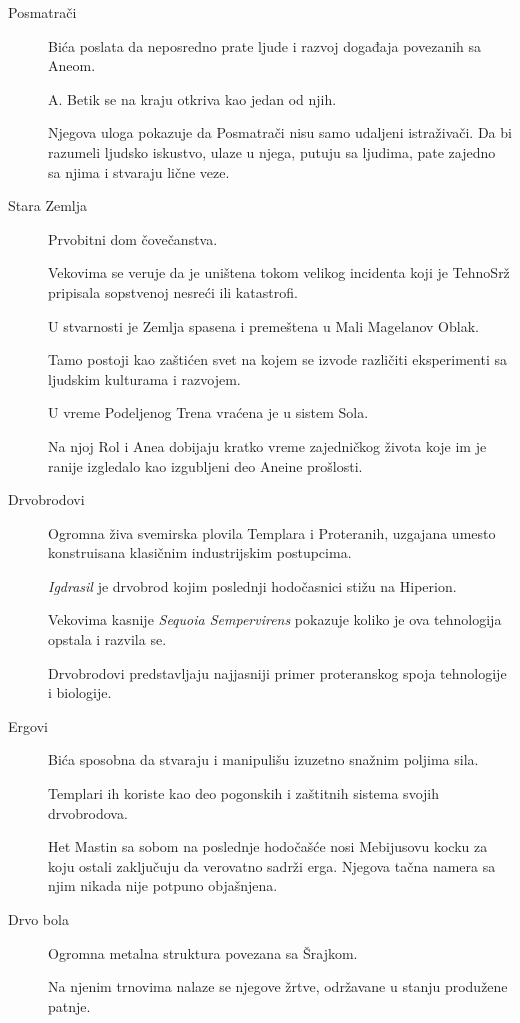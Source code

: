 \begin{description}
  \item[Posmatrači]
  Bića poslata da neposredno prate ljude i razvoj događaja povezanih sa Aneom.

  A. Betik se na kraju otkriva kao jedan od njih.

  Njegova uloga pokazuje da Posmatrači nisu samo udaljeni istraživači. Da bi razumeli ljudsko iskustvo, ulaze u njega, putuju sa ljudima, pate zajedno sa njima i stvaraju lične veze.


  \item[Stara Zemlja]
  Prvobitni dom čovečanstva.

  Vekovima se veruje da je uništena tokom velikog incidenta koji je TehnoSrž pripisala sopstvenoj nesreći ili katastrofi.

  U stvarnosti je Zemlja spasena i premeštena u Mali Magelanov Oblak.

  Tamo postoji kao zaštićen svet na kojem se izvode različiti eksperimenti sa ljudskim kulturama i razvojem.

  U vreme Podeljenog Trena vraćena je u sistem Sola.

  Na njoj Rol i Anea dobijaju kratko vreme zajedničkog života koje im je ranije izgledalo kao izgubljeni deo Aneine prošlosti.


  \item[Drvobrodovi]
  Ogromna živa svemirska plovila Templara i Proteranih, uzgajana umesto konstruisana klasičnim industrijskim postupcima.

  \emph{Igdrasil} je drvobrod kojim poslednji hodočasnici stižu na Hiperion.

  Vekovima kasnije \emph{Sequoia Sempervirens} pokazuje koliko je ova tehnologija opstala i razvila se.

  Drvobrodovi predstavljaju najjasniji primer proteranskog spoja tehnologije i biologije.


  \item[Ergovi]
  Bića sposobna da stvaraju i manipulišu izuzetno snažnim poljima sila.

  Templari ih koriste kao deo pogonskih i zaštitnih sistema svojih drvobrodova.

  Het Mastin sa sobom na poslednje hodočašće nosi Mebijusovu kocku za koju ostali zaključuju da verovatno sadrži erga. Njegova tačna namera sa njim nikada nije potpuno objašnjena.


  \item[Drvo bola]
  Ogromna metalna struktura povezana sa Šrajkom.

  Na njenim trnovima nalaze se njegove žrtve, održavane u stanju produžene patnje.


\end{description}
